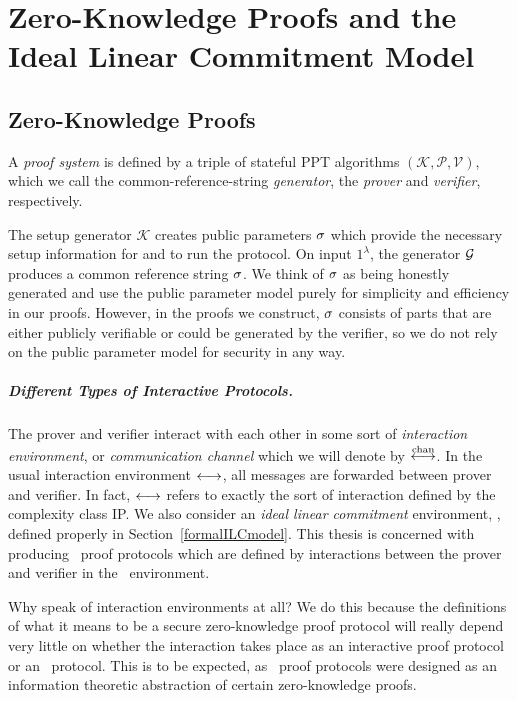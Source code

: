 \chapter{Zero-Knowledge Proofs and the Ideal Linear Commitment Model}
\label{chapterlabel:Models}

\section{Zero-Knowledge Proofs}
\label{shvzkdef}

A \emph{proof system} is defined by a triple of stateful PPT algorithms $(\mathcal{K},\mathcal{P},\mathcal{V})$, which we call the common-reference-string \emph{generator}, the \emph{prover} and \emph{verifier}, respectively.

The setup generator $\mathcal{K}$ creates public parameters $\mathsf{\sigma}$ which provide the necessary setup information for \prover and \verifier to run the protocol. On input $1^\lambda$, the generator $\mathcal{G}$ produces a common reference string $\mathsf{\sigma}$. We think of $\mathsf{\sigma}$ as being honestly generated and use the public parameter model purely for simplicity and efficiency in our proofs. However, in the proofs we construct, $\mathsf{\sigma}$ consists of parts that are either publicly verifiable or could be generated by the verifier, so we do not rely on the public parameter model for security in any way.

\paragraph{Different Types of Interactive Protocols.} The prover and verifier interact with each other in some sort of \emph{interaction environment}, or \emph{communication channel} which we will denote by $\overset{\textnormal{chan}}{\longleftrightarrow}$. In the usual interaction environment $\longleftrightarrow$, all messages are forwarded between prover and verifier. In fact, $\longleftrightarrow$ refers to exactly the sort of interaction defined by the complexity class IP. We also consider an \emph{ideal linear commitment} environment, \ILC, defined properly in Section~\ref{formalILCmodel}. This thesis is concerned with producing \ILC\ proof protocols which are defined by interactions between the prover and verifier in the \ILC\ environment.

Why speak of interaction environments at all? We do this because the definitions of what it means to be a secure zero-knowledge proof protocol will really depend very little on whether the interaction takes place as an interactive proof protocol or an \ILC\ protocol. This is to be expected, as \ILC\ proof protocols were designed as an information theoretic abstraction of certain zero-knowledge proofs.

